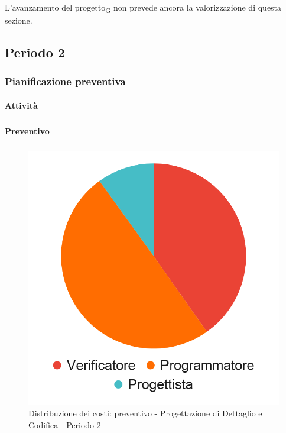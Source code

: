 L'avanzamento del progetto\textsubscript{G} non prevede ancora la valorizzazione di questa sezione.


\pagebreak
\subsection{Periodo 2}

\subsubsection{Pianificazione preventiva}

\paragraph{Attività}
\subparagraph*{}

\planningTable{
	
}

\paragraph{Preventivo}
\subparagraph*{}

\hspace{-1cm}
\begin{minipage}{.50\textwidth}
\smallPreventivoTable{
	
}
\end{minipage}
\hspace{1cm}
\begin{minipage}{.40\textwidth}
\begin{figure}[H]
	\includegraphics[scale=0.21]{res/images/charts/preventivo_priori/Grafico4-7.png}
	\caption{Distribuzione dei costi: preventivo - Progettazione di Dettaglio e Codifica - Periodo 2}
\end{figure}
\end{minipage} 



